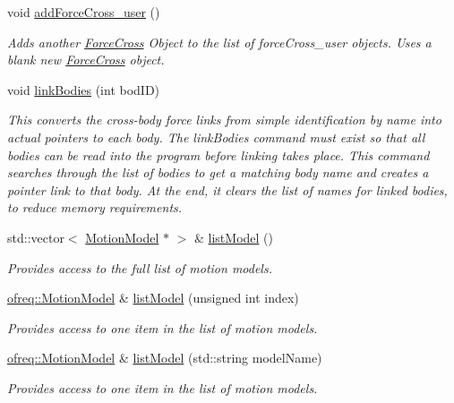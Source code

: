 \begin{DoxyCompactItemize}
void \hyperlink{classosea_1_1ofreq_1_1_system_abc3ad01f3fb22863565a8643202347f4}{add\-Force\-Cross\-\_\-user} ()
\begin{DoxyCompactList}\small\item\em Adds another \hyperlink{classosea_1_1ofreq_1_1_force_cross}{Force\-Cross} Object to the list of force\-Cross\-\_\-user objects. Uses a blank new \hyperlink{classosea_1_1ofreq_1_1_force_cross}{Force\-Cross} object. \end{DoxyCompactList}\item 
void \hyperlink{classosea_1_1ofreq_1_1_system_a280d384672341228d20181ea390118b9}{link\-Bodies} (int bod\-I\-D)
\begin{DoxyCompactList}\small\item\em This converts the cross-\/body force links from simple identification by name into actual pointers to each body. The link\-Bodies command must exist so that all bodies can be read into the program before linking takes place. This command searches through the list of bodies to get a matching body name and creates a pointer link to that body. At the end, it clears the list of names for linked bodies, to reduce memory requirements. \end{DoxyCompactList}\item 
std\-::vector$<$ \hyperlink{classosea_1_1ofreq_1_1_motion_model}{Motion\-Model} $\ast$ $>$ \& \hyperlink{classosea_1_1ofreq_1_1_system_a3a22c0f957f515c951f1cbb32c36b70e}{list\-Model} ()
\begin{DoxyCompactList}\small\item\em Provides access to the full list of motion models. \end{DoxyCompactList}\item 
\hyperlink{classosea_1_1ofreq_1_1_motion_model}{ofreq\-::\-Motion\-Model} \& \hyperlink{classosea_1_1ofreq_1_1_system_abe2ad405661178362ba0cef96a345002}{list\-Model} (unsigned int index)
\begin{DoxyCompactList}\small\item\em Provides access to one item in the list of motion models. \end{DoxyCompactList}\item 
\hyperlink{classosea_1_1ofreq_1_1_motion_model}{ofreq\-::\-Motion\-Model} \& \hyperlink{classosea_1_1ofreq_1_1_system_a65f7eaf3ac522f1dfb60d3f9a47d99ca}{list\-Model} (std\-::string model\-Name)
\begin{DoxyCompactList}\small\item\em Provides access to one item in the list of motion models. \end{DoxyCompactList}\end{DoxyCompactItemize}
